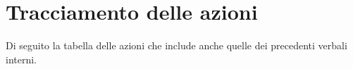 \section*{Tracciamento delle azioni}

Di seguito la tabella delle azioni che include anche quelle dei precedenti verbali interni.

\newcommand{\trackingTable}[1]{

\renewcommand{\arraystretch}{1.5}
\rowcolors{2}{pari}{dispari}
\begin{longtable}{ 
		>{\centering}M{0.25\textwidth} 
		>{\centering\arraybackslash}M{0.70\textwidth} 
		 }
		\rowcolorhead
		\headertitle{Codice} &
	 	\headertitle{Descrizione}
		\endfirsthead	
		\endhead
	
	#1

\end{longtable}
\vspace{-2em}

}

		